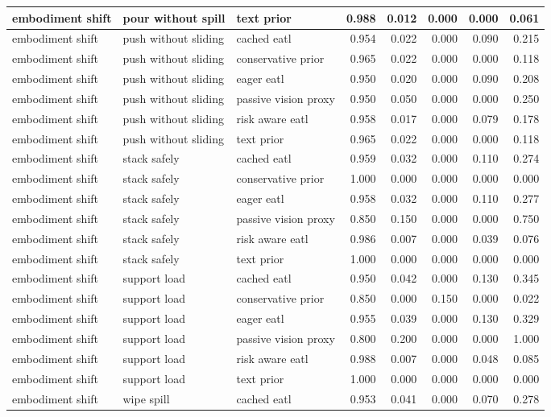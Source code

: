 \begin{longtable}{lllrrrrr}
embodiment shift & pour without spill & text prior & 0.988 & 0.012 & 0.000 & 0.000 & 0.061 \\
\midrule
embodiment shift & push without sliding & cached eatl & 0.954 & 0.022 & 0.000 & 0.090 & 0.215 \\
embodiment shift & push without sliding & conservative prior & 0.965 & 0.022 & 0.000 & 0.000 & 0.118 \\
embodiment shift & push without sliding & eager eatl & 0.950 & 0.020 & 0.000 & 0.090 & 0.208 \\
embodiment shift & push without sliding & passive vision proxy & 0.950 & 0.050 & 0.000 & 0.000 & 0.250 \\
embodiment shift & push without sliding & risk aware eatl & 0.958 & 0.017 & 0.000 & 0.079 & 0.178 \\
embodiment shift & push without sliding & text prior & 0.965 & 0.022 & 0.000 & 0.000 & 0.118 \\
\midrule
embodiment shift & stack safely & cached eatl & 0.959 & 0.032 & 0.000 & 0.110 & 0.274 \\
embodiment shift & stack safely & conservative prior & 1.000 & 0.000 & 0.000 & 0.000 & 0.000 \\
embodiment shift & stack safely & eager eatl & 0.958 & 0.032 & 0.000 & 0.110 & 0.277 \\
embodiment shift & stack safely & passive vision proxy & 0.850 & 0.150 & 0.000 & 0.000 & 0.750 \\
embodiment shift & stack safely & risk aware eatl & 0.986 & 0.007 & 0.000 & 0.039 & 0.076 \\
embodiment shift & stack safely & text prior & 1.000 & 0.000 & 0.000 & 0.000 & 0.000 \\
\midrule
embodiment shift & support load & cached eatl & 0.950 & 0.042 & 0.000 & 0.130 & 0.345 \\
embodiment shift & support load & conservative prior & 0.850 & 0.000 & 0.150 & 0.000 & 0.022 \\
embodiment shift & support load & eager eatl & 0.955 & 0.039 & 0.000 & 0.130 & 0.329 \\
embodiment shift & support load & passive vision proxy & 0.800 & 0.200 & 0.000 & 0.000 & 1.000 \\
embodiment shift & support load & risk aware eatl & 0.988 & 0.007 & 0.000 & 0.048 & 0.085 \\
embodiment shift & support load & text prior & 1.000 & 0.000 & 0.000 & 0.000 & 0.000 \\
\midrule
embodiment shift & wipe spill & cached eatl & 0.953 & 0.041 & 0.000 & 0.070 & 0.278 \\

\end{longtable}
